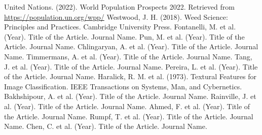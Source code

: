 \documentclass[10pt,twocolumn,letterpaper]{article}
\begin{document}
\begin{thebibliography}{9}
 United Nations. (2022). World Population Prospects 2022. Retrieved from \url{https://population.un.org/wpp/}
 Westwood, J. H. (2018). Weed Science: Principles and Practices. Cambridge University Press.
 Fontanelli, M. et al. (Year). Title of the Article. Journal Name.
 Pun, M. et al. (Year). Title of the Article. Journal Name.
 Chlingaryan, A. et al. (Year). Title of the Article. Journal Name.
 Timmermans, A. et al. (Year). Title of the Article. Journal Name.
 Tang, J. et al. (Year). Title of the Article. Journal Name.
 Pereira, L. et al. (Year). Title of the Article. Journal Name.
 Haralick, R. M. et al. (1973). Textural Features for Image Classification. IEEE Transactions on Systems, Man, and Cybernetics.
 Bakhshipour, A. et al. (Year). Title of the Article. Journal Name.
 Rainville, J. et al. (Year). Title of the Article. Journal Name.
 Ahmed, F. et al. (Year). Title of the Article. Journal Name.
 Rumpf, T. et al. (Year). Title of the Article. Journal Name.
 Chen, C. et al. (Year). Title of the Article. Journal Name.
\end{thebibliography}
\end{document}
